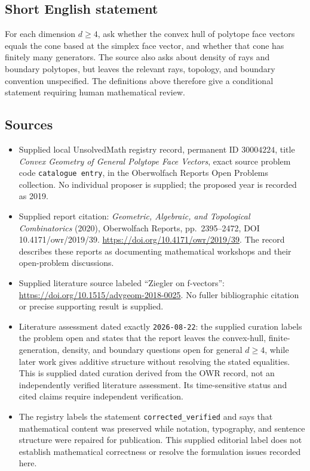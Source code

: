 \documentclass[11pt]{article}
\begin{document}
\subsection{Short English statement}
For each dimension \(d\geq4\), ask whether the convex hull of polytope face vectors equals the cone based at the simplex face vector, and whether that cone has finitely many generators. The source also asks about density of rays and boundary polytopes, but leaves the relevant rays, topology, and boundary convention unspecified. The definitions above therefore give a conditional statement requiring human mathematical review.
\subsection{Sources}
\begin{itemize}
\item Supplied local UnsolvedMath registry record, permanent ID \(30004224\), title \emph{Convex Geometry of General Polytope Face Vectors}, exact source problem code \texttt{catalogue entry}, in the Oberwolfach Reports Open Problems collection. No individual proposer is supplied; the proposed year is recorded as 2019.
\item Supplied report citation: \emph{Geometric, Algebraic, and Topological Combinatorics} (2020), Oberwolfach Reports, pp.\ 2395--2472, DOI 10.4171/owr/2019/39. \url{https://doi.org/10.4171/owr/2019/39}. The record describes these reports as documenting mathematical workshops and their open-problem discussions.
\item Supplied literature source labeled ``Ziegler on f-vectors'': \url{https://doi.org/10.1515/advgeom-2018-0025}. No fuller bibliographic citation or precise supporting result is supplied.
\item Literature assessment dated exactly \texttt{2026-08-22}: the supplied curation labels the problem open and states that the report leaves the convex-hull, finite-generation, density, and boundary questions open for general \(d\geq4\), while later work gives additive structure without resolving the stated equalities. This is supplied dated curation derived from the OWR record, not an independently verified literature assessment. Its time-sensitive status and cited claims require independent verification.
\item The registry labels the statement \texttt{corrected\_verified} and says that mathematical content was preserved while notation, typography, and sentence structure were repaired for publication. This supplied editorial label does not establish mathematical correctness or resolve the formulation issues recorded here.
\end{itemize}
\end{document}
